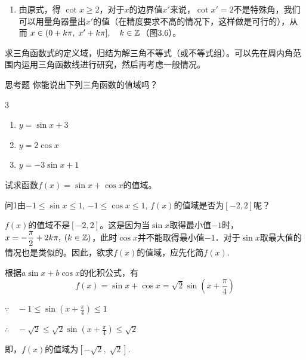 \begin{solution}
\begin{enumerate}[(1)]
\begin{minipage}{.45\textwidth}
\begin{tikzpicture}[>=stealth]
\end{tikzpicture}    
\end{minipage}

\item 由原式，得
$\cot x\ge 2$，对于$x$的边界值$x'$来说，$\cot x'=2$不是特殊角，我们可以用量角器量出$x'$的值（在精度要求不高的情况下，这样做是可行的），从而
$x\in (0+k\pi,\; x'+k\pi],\quad k\in\mathbb{Z}$（图3.6）。
\end{enumerate}
\end{solution}

\begin{remark}
求三角函数式的定义域，归结为解三角不等式（或不等式组）。可以先在周内角范围内运用三角函数线进行研究，然后再考虑一般情况。
\end{remark}

\begin{thm}
    {思考题} 你能说出下列三角函数的值域吗？
\begin{multicols}{3}
\begin{enumerate}[(1)]
    \item $y=\sin x+3$
    \item $y=2\cos x$
    \item $y=-3\sin x+1$
\end{enumerate}    
\end{multicols}
\end{thm}

\begin{example}
试求函数$f(x)=\sin x+\cos x$的值域。
\end{example}

\begin{thm}
  {问1}由$-1\le \sin x\le 1$, $-1\le \cos x\le 1$, $f(x)$的值域是否为$[-2,2]$呢？
\end{thm}

\begin{analyze}
$f(x)$的值域不是$[-2,2]$。这是因为当$\sin x$取得最小值$-1$时，$x=-\dfrac{\pi}{2}+2k\pi,\; (k\in\mathbb{Z})$，此时$\cos x$并不能取得最小值$-1$．对于$\sin x$取最大值的情况也是类似的。因此，欲求$f(x)$的值域，应先化简$f(x)$.
\end{analyze}

\begin{solution}
    根据$a\sin x +b\cos x$的化积公式，有
\[f(x)=\sin x+\cos x=\sqrt{2} \sin\left(x+\frac{\pi}{4}\right)\]

$\because\quad -1\le \sin\left(x+\frac{\pi}{4}\right)\le 1$

$\therefore\quad -\sqrt{2}\le \sqrt{2}\sin\left(x+\frac{\pi}{4}\right)\le \sqrt{2}$

即，$f(x)$的值域为$\left[-\sqrt{2},\; \sqrt{2}\right]$.
\end{solution}

